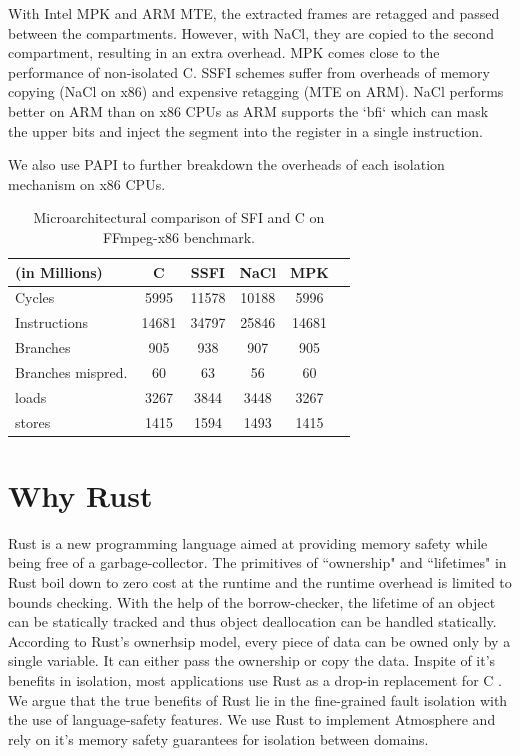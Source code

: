 With Intel MPK and ARM MTE, the extracted frames are retagged and passed between the compartments. However, with NaCl, they are copied to the second compartment, resulting in an extra overhead. MPK comes close to the performance of non-isolated C. SSFI schemes suffer from overheads of memory copying (NaCl on x86) and expensive retagging (MTE on ARM). NaCl performs better on ARM than on x86 CPUs as ARM supports the `bfi` which can mask the upper bits and inject the segment into the register in a single instruction.

We also use PAPI\cite{papi} to further breakdown the overheads of each isolation mechanism on x86 CPUs.

\begin{table}[!htbp]
    \begin{small}
    \begin{center}
  \begin{tabular}{| l | c | c | c | c | c |}
  \hline
  (in Millions)    & C   & SSFI   & NaCl & MPK   \\
  \hline
  \hline
  Cycles           & 5995 & 11578  & 10188 & 5996  \\
  Instructions     & 14681  & 34797  & 25846 & 14681 \\
  Branches         & 905   & 938   & 907  & 905   \\
  Branches mispred.& 60   & 63    & 56   & 60    \\
  loads            & 3267  & 3844  & 3448 & 3267  \\
  stores           & 1415  & 1594   & 1493  & 1415   \\
    \hline
    \end{tabular}
    \end{center}
  \end{small}
  \caption{Microarchitectural comparison of SFI and C on FFmpeg-x86 benchmark.}
  \label{table:micro-ffmpeg-x86}
\end{table}

\section{Why Rust}
Rust\cite{rust} is a new programming language aimed at providing memory safety while being free of a garbage-collector. The primitives of ``ownership" and ``lifetimes" in Rust boil down to zero cost at the runtime and the runtime overhead is limited to bounds checking. With the help of the borrow-checker, the lifetime of an object can be statically tracked and thus object deallocation can be handled statically. According to Rust's ownerhsip model, every piece of data can be owned only by a single variable. It can either pass the ownership or copy the data.
Inspite of it's benefits in isolation, most applications use Rust as a drop-in replacement for C \cite{rust-isolation}. We argue that the true benefits of Rust lie in the fine-grained fault isolation with the use of language-safety features. We use Rust to implement Atmosphere and rely on it's memory safety guarantees for isolation between domains.
